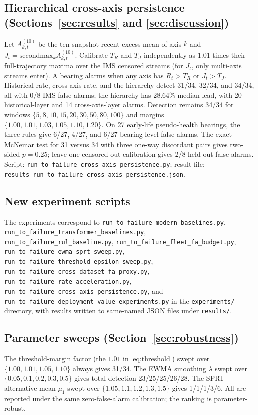 \documentclass[journal]{IEEEtran}
\begin{document}
\subsection*{Hierarchical cross-axis persistence (Sections~\ref{sec:results} and \ref{sec:discussion})}
Let $A_{k,t}^{(10)}$ be the ten-snapshot recent excess mean of axis $k$ and $J_t=\mathrm{secondmax}_k A_{k,t}^{(10)}$. Calibrate $T_R$ and $T_J$ independently as 1.01 times their full-trajectory maxima over the IMS censored streams (for $J_t$, only multi-axis streams enter). A bearing alarms when any axis has $R_t>T_R$ or $J_t>T_J$. Historical rate, cross-axis rate, and the hierarchy detect 31/34, 32/34, and 34/34, all with 0/8 IMS false alarms; the hierarchy has 28.64\% median lead, with 20 historical-layer and 14 cross-axis-layer alarms. Detection remains 34/34 for windows $\{5,8,10,15,20,30,50,80,100\}$ and margins $\{1.00,1.01,1.03,1.05,1.10,1.20\}$. On 27 early-life pseudo-health bearings, the three rules give 6/27, 4/27, and 6/27 bearing-level false alarms. The exact McNemar test for 31 versus 34 with three one-way discordant pairs gives two-sided $p=0.25$; leave-one-censored-out calibration gives 2/8 held-out false alarms. Script: \texttt{run\_to\_failure\_cross\_axis\_persistence.py}; result file: \texttt{results\_run\_to\_failure\_cross\_axis\_persistence.json}.

\subsection*{New experiment scripts}
The experiments correspond to \texttt{run\_to\_failure\_modern\_baselines.py}, \texttt{run\_to\_failure\_transformer\_baselines.py}, \texttt{run\_to\_failure\_rul\_baseline.py}, \texttt{run\_to\_failure\_fleet\_fa\_budget.py}, \texttt{run\_to\_failure\_ewma\_sprt\_sweep.py}, \texttt{run\_to\_failure\_threshold\_epsilon\_sweep.py}, \texttt{run\_to\_failure\_cross\_dataset\_fa\_proxy.py}, \texttt{run\_to\_failure\_rate\_acceleration.py}, \texttt{run\_to\_failure\_cross\_axis\_persistence.py}, and \texttt{run\_to\_failure\_deployment\_value\_experiments.py} in the \texttt{experiments/} directory, with results written to same-named JSON files under \texttt{results/}.

\subsection*{Parameter sweeps (Section~\ref{sec:robustness})}
The threshold-margin factor (the $1.01$ in \eqref{eq:threshold}) swept over $\{1.00,1.01,1.05,1.10\}$ always gives 31/34. The EWMA smoothing $\lambda$ swept over $\{0.05,0.1,0.2,0.3,0.5\}$ gives total detection 23/25/25/26/28. The SPRT alternative mean $\mu_1$ swept over $\{1.05,1.1,1.2,1.3,1.5\}$ gives 1/1/1/3/6. All are reported under the same zero-false-alarm calibration; the ranking is parameter-robust.
\end{document}
